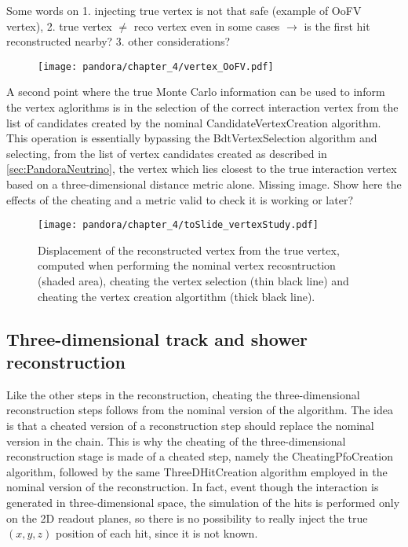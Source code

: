 {\color{red} Some words on 1. injecting true vertex is not that safe (example of OoFV vertex), 2. true vertex $\neq$ reco vertex even in some cases $\to$ is the first hit reconstructed nearby? 3. other considerations?}


\begin{figure}
    \centering
    \texttt{[image: pandora/chapter\_4/vertex\_OoFV.pdf]}
    \caption[CheatingVertexCreation with an OoFV vertex]{}
    \label{fig:CheatingVertexCreation}
\end{figure}

A second point where the true Monte Carlo information can be used to inform the vertex aglorithms is in the selection of the correct interaction vertex from the list of candidates created by the nominal CandidateVertexCreation algorithm. This operation is essentially bypassing the BdtVertexSelection algorithm and selecting, from the list of vertex candidates created as described in \autoref{sec:PandoraNeutrino}, the vertex which lies closest to the true interaction vertex based on a three-dimensional distance metric alone. 
{\color{red} Missing image. Show here the effects of the cheating and a metric valid to check it is working or later?}

\begin{figure}
    \centering
    \texttt{[image: pandora/chapter\_4/toSlide\_vertexStudy.pdf]}
    \caption[Vertex displacement from truth]{Displacement of the reconstructed vertex from the true vertex, computed when performing the nominal vertex recosntruction (shaded area), cheating the vertex selection (thin black line) and cheating the vertex creation algortithm (thick black line). }
    \label{fig:enter-label}
\end{figure}


\subsection{Three-dimensional track and shower reconstruction}

Like the other steps in the reconstruction, cheating the three-dimensional reconstruction steps follows from the nominal version of the algorithm. The idea is that a cheated version of a reconstruction step should replace the nominal version in the chain. This is why the cheating of the three-dimensional reconstruction stage is made of a cheated step, namely the CheatingPfoCreation algorithm, followed by the same ThreeDHitCreation algorithm employed in the nominal version of the reconstruction. In fact, event though the interaction is generated in three-dimensional space, the simulation of the hits is performed only on the 2D readout planes, so there is no possibility to really inject the true $(x,y,z)$ position of each hit, since it is not known. 

